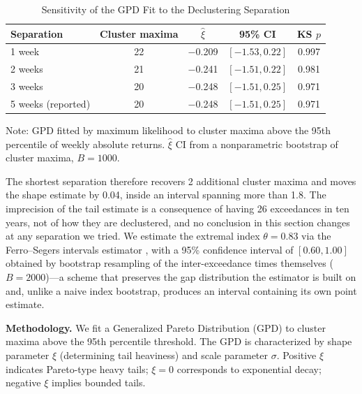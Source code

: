\documentclass[11pt]{article}
\begin{document}
\begin{table}[H]
\centering
\caption{Sensitivity of the GPD Fit to the Declustering Separation}
\label{tab:decluster}
\small
\begin{tabular}{@{}lcccc@{}}
\toprule
Separation & Cluster maxima & $\hat{\xi}$ & 95\% CI & KS $p$ \\
\midrule
1 week & 22 & $-$0.209 & $[-1.53, 0.22]$ & 0.997 \\
2 weeks & 21 & $-$0.241 & $[-1.51, 0.22]$ & 0.981 \\
3 weeks & 20 & $-$0.248 & $[-1.51, 0.25]$ & 0.971 \\
5 weeks (reported) & 20 & $-$0.248 & $[-1.51, 0.25]$ & 0.971 \\
\bottomrule
\end{tabular}
\par\vspace{0.3em}
\parbox{\linewidth}{\footnotesize Note: GPD fitted by maximum likelihood to cluster maxima above the 95th percentile of weekly absolute returns. $\hat{\xi}$ CI from a nonparametric bootstrap of cluster maxima, $B = 1000$.}
\end{table}

The shortest separation therefore recovers 2 additional cluster maxima and moves the shape estimate by 0.04, inside an interval spanning more than 1.8. The imprecision of the tail estimate is a consequence of having 26 exceedances in ten years, not of how they are declustered, and no conclusion in this section changes at any separation we tried. We estimate the extremal index $\theta = 0.83$ via the Ferro--Segers intervals estimator \citep{ferro2003inference}, with a 95\% confidence interval of $[0.60, 1.00]$ obtained by bootstrap resampling of the inter-exceedance times themselves ($B = 2000$)---a scheme that preserves the gap distribution the estimator is built on and, unlike a naive index bootstrap, produces an interval containing its own point estimate.

\textbf{Methodology.} We fit a Generalized Pareto Distribution (GPD) to cluster maxima above the 95th percentile threshold. The GPD is characterized by shape parameter $\xi$ (determining tail heaviness) and scale parameter $\sigma$. Positive $\xi$ indicates Pareto-type heavy tails; $\xi = 0$ corresponds to exponential decay; negative $\xi$ implies bounded tails.
\end{document}
